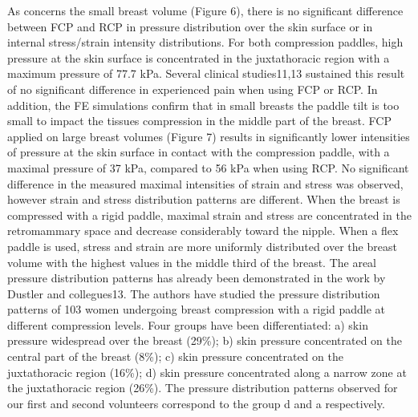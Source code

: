 As concerns the small breast volume (Figure 6), there is no significant difference between FCP and RCP in pressure distribution over the skin surface or in internal stress/strain intensity distributions. For both compression paddles, high pressure at the skin surface is concentrated in the juxtathoracic region with a maximum pressure of 77.7 kPa. Several clinical studies11,13 sustained this result of no significant difference in experienced pain when using FCP or RCP. In addition, the FE simulations confirm that in small breasts the paddle tilt is too small to impact the tissues compression in the middle part of the breast. 
FCP applied on large breast volumes (Figure 7) results in significantly lower intensities of pressure at the skin surface in contact with the compression paddle, with a maximal pressure of 37 kPa, compared to 56 kPa when using RCP. No significant difference in the measured maximal intensities of strain and stress was observed, however strain and stress distribution patterns are different. When the breast is compressed with a rigid paddle, maximal strain and stress are concentrated in the retromammary space and decrease considerably toward the nipple. When a flex paddle is used, stress and strain are more uniformly distributed over the breast volume with the highest values in the middle third of the breast.
The areal pressure distribution patterns has already been demonstrated in the work by Dustler and collegues13. The authors have studied the pressure distribution patterns of 103 women undergoing breast compression with a rigid paddle at different compression levels. Four groups have been differentiated: a) skin pressure widespread over the breast (29\%); b) skin pressure concentrated on the central part of the breast (8\%); c) skin pressure concentrated on the juxtathoracic region (16\%); d) skin pressure concentrated along a narrow zone at the juxtathoracic region (26\%).  The pressure distribution patterns observed for our first and second volunteers correspond to the group d and a respectively.


